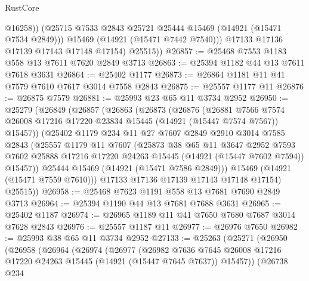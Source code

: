 \begin{lexlean}{RustCore}
\begin{coremodule}
                @16258))
            (@25715 @7533 @2843 @25721 @25444 @15469 (@14921 (@15471 @7534 @2849)))
            @15469
            (@14921 (@15471 @7442 @7540)))
          @17133
          @17136
          @17139
          @17143
          @17148
          @17154)
        @25515))
@26857 := @25468 @7553 @1183 @558 @13 @7611 @7620 @2849 @3713
@26863 := @25394 @1182 @44 @13 @7611 @7618 @3631
@26864 := @25402 @1177
@26873 := @26864 @1181 @11 @41 @7579 @7610 @7617 @3014 @7558 @2843
@26875 := @25557 @1177 @11
@26876 := @26875 @7579
@26881 := @25993 @23 @65 @11 @3734 @2952
@26950 := @25279
    (@26849
      (@26857
        (@26863
          (@26873
            (@26876
              (@26881
                @7566
                @7574
                @26008
                @17216
                @17220
                @23834
                @15445
                (@14921 (@15447 @7574 @7567))
                @15457))
            (@25402
              @1179
              @234
              @11
              @27
              @7607
              @2849
              @2910
              @3014
              @7585
              @2843
              (@25557
                @1179
                @11
                @7607
                (@25873
                  @38
                  @65
                  @11
                  @3647
                  @2952
                  @7593
                  @7602
                  @25888
                  @17216
                  @17220
                  @24263
                  @15445
                  (@14921 (@15447 @7602 @7594))
                  @15457))
              @25444
              @15469
              (@14921 (@15471 @7586 @2849)))
            @15469
            (@14921 (@15471 @7559 @7610)))
          @17133
          @17136
          @17139
          @17143
          @17148
          @17154)
        @25515))
@26958 := @25468 @7623 @1191 @558 @13 @7681 @7690 @2849 @3713
@26964 := @25394 @1190 @44 @13 @7681 @7688 @3631
@26965 := @25402 @1187
@26974 := @26965 @1189 @11 @41 @7650 @7680 @7687 @3014 @7628 @2843
@26976 := @25557 @1187 @11
@26977 := @26976 @7650
@26982 := @25993 @38 @65 @11 @3734 @2952
@27133 := @25263
    (@25271
      (@26950
        (@26958
          (@26964
            (@26974
              (@26977
                (@26982
                  @7636
                  @7645
                  @26008
                  @17216
                  @17220
                  @24263
                  @15445
                  (@14921 (@15447 @7645 @7637))
                  @15457))
              (@26738
                @234

\end{coremodule}
\end{lexlean}
